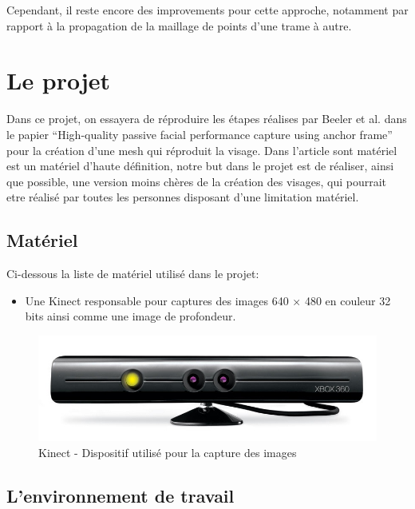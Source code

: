 \documentclass[a4paper,10pt]{article}
\begin{document}
Cependant, il reste encore des improvements pour cette approche, notamment par rapport à la propagation de la maillage de points d'une trame à autre.

\section{Le projet}

Dans ce projet, on essayera de réproduire les étapes réalises par Beeler et al. dans le papier ``High-quality passive facial performance capture using anchor frame'' pour la création d'une mesh qui réproduit la visage.
Dans l'article sont matériel est un matériel d'haute définition, notre but dans le projet est de réaliser, ainsi que possible, une version moins chères de la création des visages, qui pourrait etre réalisé par toutes les personnes disposant d'une limitation matériel.

\subsection{Matériel}

Ci-dessous la liste de matériel utilisé dans le projet: 

\begin{itemize}
\item Une Kinect responsable pour captures des images 640 × 480 en couleur 32 bits ainsi comme une image de profondeur. 
\end{itemize}

\begin{figure}[h!]
  \begin{center}
    \includegraphics[scale=0.2]{img/kinect.jpg}
    \caption{Kinect - Dispositif utilisé pour la capture des images}
  \end{center}
\end{figure}

\subsection{L'environnement de travail}
\end{document}
